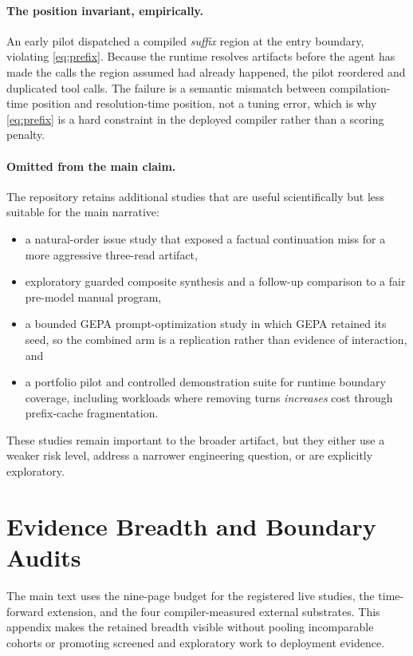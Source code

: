 \paragraph{The position invariant, empirically.}
\label{app:pilot}
An early pilot dispatched a compiled \emph{suffix} region at the entry boundary,
violating \cref{eq:prefix}. Because the runtime resolves artifacts before the
agent has made the calls the region assumed had already happened, the pilot
reordered and duplicated tool calls. The failure is a semantic mismatch between
compilation-time position and resolution-time position, not a tuning error,
which is why \cref{eq:prefix} is a hard constraint in the deployed compiler
rather than a scoring penalty.

\paragraph{Omitted from the main claim.}
The repository retains additional studies that are useful scientifically but
less suitable for the main narrative:
\begin{itemize}[leftmargin=1.2em,itemsep=1pt,topsep=2pt]
  \item a natural-order issue study that exposed a factual continuation miss for
  a more aggressive three-read artifact,
  \item exploratory guarded composite synthesis and a follow-up comparison to a
  fair pre-model manual program,
  \item a bounded GEPA prompt-optimization study in which GEPA retained its
  seed, so the combined arm is a replication rather than evidence of
  interaction, and
  \item a portfolio pilot and controlled demonstration suite for runtime
  boundary coverage, including workloads where removing turns \emph{increases}
  cost through prefix-cache fragmentation.
\end{itemize}
These studies remain important to the broader artifact, but they either use a
weaker risk level, address a narrower engineering question, or are explicitly
exploratory.

\section{Evidence Breadth and Boundary Audits}
\label{app:breadth}

The main text uses the nine-page budget for the registered live studies, the
time-forward extension, and the four compiler-measured external substrates. This
appendix makes the retained breadth visible without pooling incomparable cohorts
or promoting screened and exploratory work to deployment evidence.

